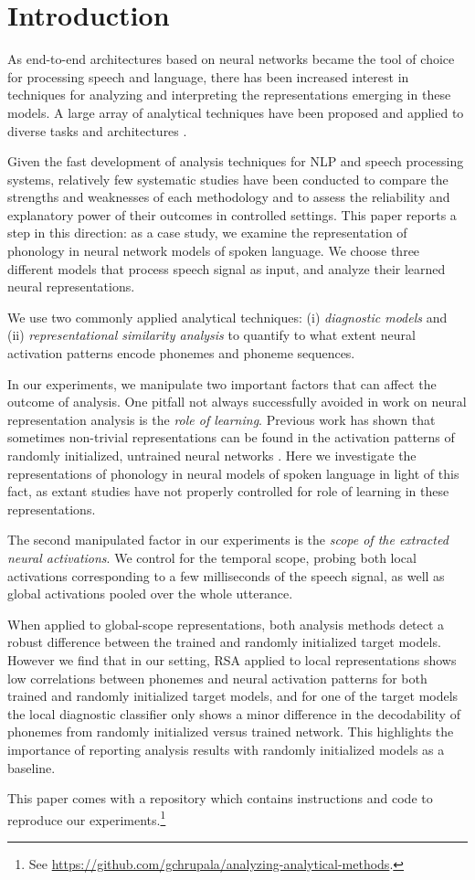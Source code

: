 \section{Introduction}
\label{sec:intro}
As end-to-end architectures based on neural networks became the tool of choice
for processing speech and language, there has been increased interest in
techniques for analyzing and interpreting the representations emerging in these
models. A large array of analytical techniques have been proposed and applied
to diverse tasks and architectures
\citep{belinkov2019analysis,alishahi2019analyzing}.

Given the fast development of analysis techniques for NLP and speech processing
systems, relatively few systematic studies have been conducted to compare the
strengths and weaknesses of each methodology and to assess the reliability and
explanatory power of their outcomes in controlled settings.  This paper reports
a step in this direction: as a case study, we examine the representation of
phonology in neural network models of spoken language. We choose three
different models that process speech signal as input, and analyze their learned
neural representations.

We use two commonly applied analytical techniques: (i) {\it diagnostic models}
and (ii) {\it representational similarity analysis} to quantify to what extent
neural activation patterns encode phonemes and phoneme sequences.

In our experiments, we manipulate two important factors that can affect the
outcome of analysis. One pitfall not always successfully avoided in work on
neural representation analysis is the {\it role of learning}. Previous work has
shown that sometimes non-trivial representations can be found in the activation
patterns of randomly initialized, untrained neural networks
\citep{DBLP:journals/corr/abs-1809-10040,chrupala-alishahi-2019-correlating}.
Here we investigate the representations of phonology in neural models of spoken
language in light of this fact, as extant studies have not properly controlled
for role of learning in these representations.

The second manipulated factor in our experiments is the {\it scope of the
extracted neural activations}. We control for the temporal scope, probing both
local activations corresponding to a few milliseconds of the speech signal, as
well as global activations pooled over the whole utterance.

When applied to global-scope representations, both analysis methods detect
a robust difference between the trained and randomly initialized
target models. However we find that in our setting, RSA applied to
local representations shows low correlations between phonemes and
neural activation patterns for both trained and randomly initialized
target models, and for one of the target models the local diagnostic
classifier only shows a minor difference in the decodability of
phonemes from randomly initialized versus trained network. This
highlights the importance of reporting analysis results with randomly
initialized models as a baseline.

This paper comes with a repository which contains instructions and
code to reproduce our experiments.\footnote{See \href{https://github.com/gchrupala/analyzing-analytical-methods}{https://github.com/gchrupala/analyzing-analytical-methods}.}
